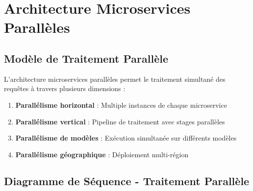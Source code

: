\documentclass[12pt,a4paper]{article}
\begin{document}
\section{Architecture Microservices Parallèles}

\subsection{Modèle de Traitement Parallèle}

L'architecture microservices parallèles permet le traitement simultané des requêtes à travers plusieurs dimensions :

\begin{enumerate}
    \item \textbf{Parallélisme horizontal} : Multiple instances de chaque microservice
    \item \textbf{Parallélisme vertical} : Pipeline de traitement avec stages parallèles
    \item \textbf{Parallélisme de modèles} : Exécution simultanée sur différents modèles
    \item \textbf{Parallélisme géographique} : Déploiement multi-région
\end{enumerate}

\subsection{Diagramme de Séquence - Traitement Parallèle}
\end{document}
